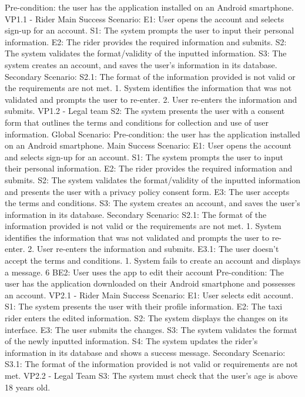 Pre-condition: the user has the application installed on an Android smartphone.
VP1.1 - Rider
Main Success Scenario:
E1: User opens the account and selects sign-up for an account.
S1: The system prompts the user to input their personal information.
E2: The rider provides the required information and submits.
S2: The system validates the format/validity of the inputted information.
S3: The system creates an account, and saves the user’s information in its database.
Secondary Scenario:
S2.1: The format of the information provided is not valid or the requirements are not met.
1. System identifies the information that was not validated and prompts the user to re-enter.
2. User re-enters the information and submits.
VP1.2 - Legal team
S2: The system presents the user with a consent form that outlines the terms and conditions for
collection and use of user information.
Global Scenario:
Pre-condition: the user has the application installed on an Android smartphone.
Main Success Scenario:
E1: User opens the account and selects sign-up for an account.
S1: The system prompts the user to input their personal information.
E2: The rider provides the required information and submits.
S2: The system validates the format/validity of the inputted information and presents the user with
a privacy policy consent form.
E3: The user accepts the terms and conditions.
S3: The system creates an account, and saves the user’s information in its database.
Secondary Scenario:
S2.1: The format of the information provided is not valid or the requirements are not met.
1. System identifies the information that was not validated and prompts the user to re-enter.
2. User re-enters the information and submits.
E3.1: The user doesn’t accept the terms and conditions.
1. System fails to create an account and displays a message.
6
BE2: User uses the app to edit their account
Pre-condition: The user has the application downloaded on their Android smartphone and possesses
an account.
VP2.1 - Rider
Main Success Scenario:
E1: User selects edit account.
S1: The system presents the user with their profile information.
E2: The taxi rider enters the edited information.
S2: The system displays the changes on its interface.
E3: The user submits the changes.
S3: The system validates the format of the newly inputted information.
S4: The system updates the rider’s information in its database and shows a success message.
Secondary Scenario:
S3.1: The format of the information provided is not valid or requirements are not met.
VP2.2 - Legal Team
S3: The system must check that the user’s age is above 18 years old.
